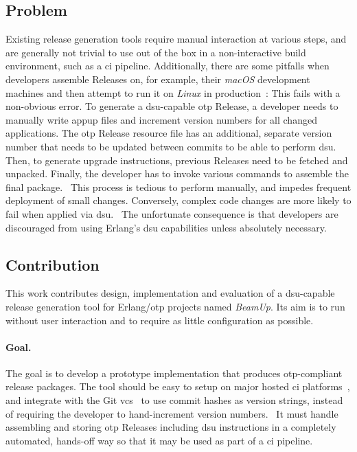 \subsection{Problem}\label{sec:problem} Existing release generation tools require manual interaction at various steps, and are generally not trivial to use out of the box in a non-interactive build environment, such as a \acrfull{ci} pipeline. Additionally, there are some pitfalls when developers assemble Releases on, for example, their \emph{macOS} development machines and then attempt to run it on \emph{Linux} in production~\cite{cesarini:otp}: This fails with a non-obvious error. To generate a \acrshort{dsu}-capable \acrshort{otp} Release, a developer needs to manually write \acrshort{appup} files and increment version numbers for all changed applications. The \acrshort{otp} Release resource file has an additional, separate version number that needs to be updated between commits to be able to perform \acrshort{dsu}. Then, to generate upgrade instructions, previous Releases need to be fetched and unpacked. Finally, the developer has to invoke various commands to assemble the final package.~\cite{ferd} This process is tedious to perform manually, and impedes frequent deployment of small changes. Conversely, complex code changes are more likely to fail when applied via \acrshort{dsu}.~\cite{hicks} The unfortunate consequence is that developers are discouraged from using Erlang's \acrshort{dsu} capabilities unless absolutely necessary.~\cite{ferd}

\subsection{Contribution}

This work contributes design, implementation and evaluation of a \acrshort{dsu}-capable release generation tool for Erlang/\acrshort{otp} projects named \emph{BeamUp}. Its aim is to run without user interaction and to require as little configuration as possible.

\paragraph{Goal.} The goal is to develop a prototype implementation that produces \acrshort{otp}-compliant release packages. The tool should be easy to setup on major hosted \acrshort{ci} platforms~\cite{dig2016usage}, and integrate with the Git \acrfull{vcs}~\cite{sink2011version} to use commit hashes as version strings, instead of requiring the developer to hand-increment version numbers.~\cite{maste2016} It must handle assembling and storing \acrshort{otp} Releases including \acrshort{dsu} instructions in a completely automated, hands-off way so that it may be used as part of a \acrshort{ci} pipeline.

